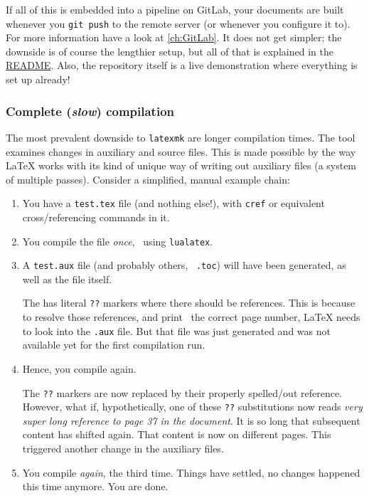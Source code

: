 If all of this is embedded into a pipeline on GitLab, your documents are built whenever
you \texttt{git push} to the remote server (or whenever you configure it to). For more
information have a look at \cref{ch:GitLab}. It does not get simpler; the downside is of course the
lengthier setup, but all of that is explained in the
\href{https://collaborating.tuhh.de/alex/latex-cookbook/-/blob/master/README.md}{README}.
Also, the repository itself is a live demonstration where everything is set up already!

\subsubsection{Complete (\emph{slow}) compilation}

The most prevalent downside to \texttt{latexmk} are longer compilation times.
The tool examines changes in auxiliary and source files.
This is made possible by the way \LaTeX{} works with its kind of unique way of writing out auxiliary files (a system of multiple passes).
Consider a simplified, manual example chain:
\begin{enumerate}
  \item You have a \texttt{test.tex} file (and nothing else!), with \texttt{cref} or equivalent cross\-/referencing commands in it.
  \item You compile the file \emph{once}, \ using \texttt{lualatex}.
  \item A \texttt{test.aux} file (and probably others, \ \texttt{.toc}) will have been generated, as well as the  file itself.

        The  has literal \verb|??| markers where there should be references.
        This is because to resolve those references, and print \ the correct page number, \LaTeX{} needs to look into the \texttt{.aux} file.
        But that file was just generated and was not available yet for the first compilation run.
   \item Hence, you compile again.

        The \verb|??| markers are now replaced by their properly spelled\-/out reference.
        However, what if, hypothetically, one of these \verb|??| substitutions now reads \emph{very super long reference to page 37 in the document}.
        It is so long that subsequent content has shifted again.
        That content is now on different pages.
        This triggered another change in the auxiliary files.
   \item \label{item:last_compilation} You compile \emph{again}, the third time.
        Things have settled, no changes happened this time anymore.
        You are done.
\end{enumerate}

